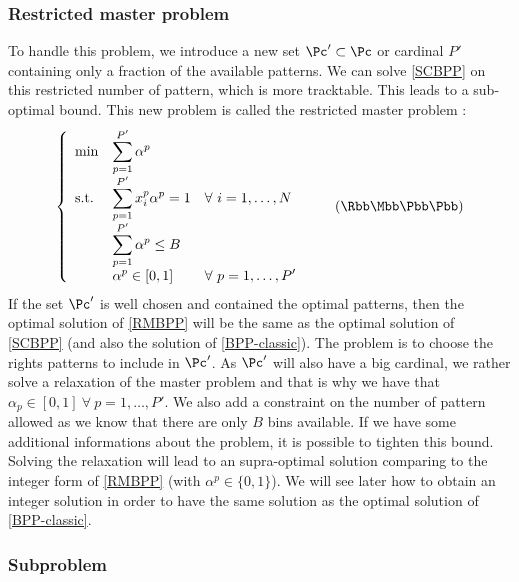 \subsubsection{Restricted master problem}

To handle this problem, we introduce a new set $\Pc' \subset \Pc$ or cardinal $P'$ containing only a fraction of the available patterns. We can solve \eqref{SCBPP} on this restricted number of pattern, which is more tracktable. This leads to a sub-optimal bound. This new problem is called the restricted master problem :
\begin{equation}
	\label{RMBPP}
	\left \{
	\begin{array}{*5{>{\displaystyle}l}}
	\min & \sum_{p=1}^{P'} \alpha^p \\
	\st & \sum_{p=1}^{P'} x_i^p\alpha^p = 1 & \forall \ i = 1,\dots,N \\
	& \sum_{p=1}^{P'} \alpha^p \leq B \\
	& \alpha^{p} \in [0,1] &  \forall \ p = 1,\dots,P'
	\end{array}
	\right.
	\tag{$\Rbb\Mbb\Bbb\Pbb\Pbb$}
\end{equation}
If the set $\Pc'$ is well chosen and contained the optimal patterns, then the optimal solution of \eqref{RMBPP} will be the same as the optimal solution of \eqref{SCBPP} (and also the solution of \eqref{BPP-classic}). The problem is to choose the rights patterns to include in $\Pc'$. As $\Pc'$ will also have a big cardinal, we rather solve a relaxation of the master problem and that is why we have that $\alpha_{p} \in [0,1] \ \forall \ p = 1,\dots,P'$. We also add a constraint on the number of pattern allowed as we know that there are only $B$ bins available. If we have some additional informations about the problem, it is possible to tighten this bound. Solving the relaxation will lead to an supra-optimal solution comparing to the integer form of \eqref{RMBPP} (with $ \alpha^{p} \in \{0,1\}$). We will see later how to obtain an integer solution in order to have the same solution as the optimal solution of \eqref{BPP-classic}.

\subsubsection{Subproblem}

